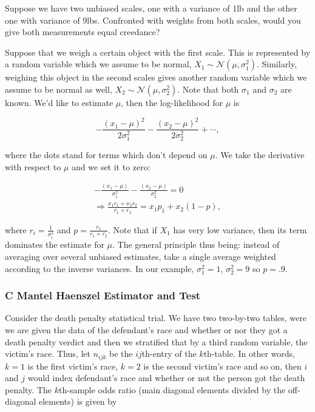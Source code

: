 \documentclass{homework}
\begin{document}
Suppose we have two unbiased scales, one with a variance of 1lb and the other one with variance of 9lbs. Confronted with weights from both scales, would you give both measurements equal creedance?

Suppose that we weigh a certain object with the first scale. This is represented by a random variable which we assume to be normal, $X_1 \sim \mathcal{N}(\mu, \sigma_1^2)$. Similarly, weighing this object in the second scales gives another random variable which we assume to be normal as well, $X_2 \sim \mathcal{N}(\mu, \sigma_2^2)$. Note that both $\sigma_1$ and $\sigma_2$ are known. We'd like to estimate $\mu$, then the log-likelihood for $\mu$ is 

$$
-\frac{(x_1-\mu)^2}{2\sigma_1^2}-\frac{(x_2-\mu)^2}{2\sigma_2^2} + \cdots,
$$

where the dots stand for terms which don't depend on $\mu$. We take the derivative with respect to $\mu$ and we set it to zero:

\begin{align*}
-\frac{(x_1-\mu)}{\sigma_1^2}-\frac{(x_2-\mu)}{\sigma_2^2} = 0 \\
\Rightarrow\frac{x_1r_1+x_2r_2}{r_1+r_2} = x_1 p_1 + x_2(1-p),
\end{align*}

where $r_i = \frac{1}{\sigma_i^2}$ and $p = \frac{r_1}{r_1+r_2}$. Note that if $X_1$ has very low variance, then its term dominates the estimate for $\mu$. The general principle thus being: instead of averaging over several unbiased estimates, take a single average weighted according to the inverse variances. In our example, $\sigma_1^2 =1$,  $\sigma_2^2 =9$ so $p=.9$.  

\subsubsection{C Mantel Haenszel Estimator and Test}

Consider the death penalty statistical trial. We have two two-by-two tables, were we are given the data of the defendant's race and whether or nor they got a death penalty verdict and then we stratified that by a third random variable, the victim's race. Thus, let $n_{ijk}$ be the $ij$th-entry of the $k$th-table. In other words, $k=1$ is the first victim's race, $k=2$ is the second victim's race and so on, then $i$ and $j$ would index defendant's race and whether or not the person got the death penalty. The $k$th-sample odds ratio (main diagonal elements divided by the off-diagonal elements) is given by 
\end{document}
